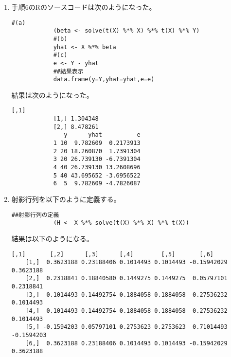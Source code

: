 \documentclass[12pt]{jarticle}
\begin{document}
\begin{enumerate}
\begin{lstlisting}[style = lstR]
            #(c)
            xSSD <- sum((X[,2]-xbar)^2)
            #(d)
            ySSD <- sum((Y-ybar)^2)
            ##結果表示
            data.frame(x.SSD = xSSD, y.SSD = ySSD)
\end{lstlisting}
          結果は次のようになった。
          \begin{lstlisting}[style=log]
              x.mean y.mean
            1    2.5   22.5
              x.SSD  y.SSD
            1  11.5 1087.5
          \end{lstlisting}
    \item 手順6のRのソースコードは次のようになった。
          \begin{lstlisting}[style = lstR]
            #(a)
            (beta <- solve(t(X) %*% X) %*% t(X) %*% Y)
            #(b)
            yhat <- X %*% beta 
            #(c)
            e <- Y - yhat
            ##結果表示
            data.frame(y=Y,yhat=yhat,e=e)
\end{lstlisting}
          結果は次のようになった。
          \begin{lstlisting}[style=log]
                     [,1]
            [1,] 1.304348
            [2,] 8.478261
               y      yhat          e
            1 10  9.782609  0.2173913
            2 20 18.260870  1.7391304
            3 20 26.739130 -6.7391304
            4 40 26.739130 13.2608696
            5 40 43.695652 -3.6956522
            6  5  9.782609 -4.7826087
      \end{lstlisting}
    \item 射影行列を以下のように定義する。
          \begin{lstlisting}[style = lstR]
            ##射影行列の定義
            (H <- X %*% solve(t(X) %*% X) %*% t(X))
\end{lstlisting}
          結果は以下のようになる。
          \begin{lstlisting}[style=log]
               [,1]       [,2]      [,3]      [,4]        [,5]       [,6]
    [1,]  0.3623188 0.23188406 0.1014493 0.1014493 -0.15942029  0.3623188
    [2,]  0.2318841 0.18840580 0.1449275 0.1449275  0.05797101  0.2318841
    [3,]  0.1014493 0.14492754 0.1884058 0.1884058  0.27536232  0.1014493
    [4,]  0.1014493 0.14492754 0.1884058 0.1884058  0.27536232  0.1014493
    [5,] -0.1594203 0.05797101 0.2753623 0.2753623  0.71014493 -0.1594203
    [6,]  0.3623188 0.23188406 0.1014493 0.1014493 -0.15942029  0.3623188
    \end{lstlisting}
          \clearpage
          \begin{itemize}

\end{itemize}
\end{enumerate}
\end{document}

